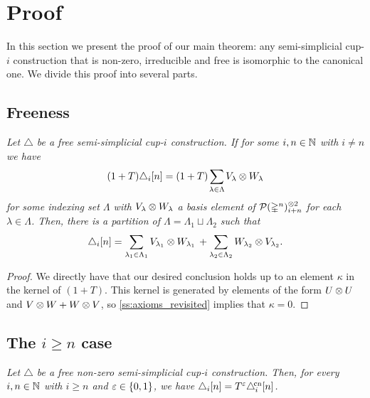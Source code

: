 
\section{Proof}\label{s:proof}

In this section we present the proof of our main theorem: any semi-simplicial \mbox{cup-$i$} construction that is non-zero, irreducible and free is isomorphic to the canonical one.
We divide this proof into several parts.

\subsection{Freeness}\label{ss:freeness_revisited}

\textit{
	Let $\triangle$ be a free semi-simplicial \mbox{cup-$i$} construction.
	If for some $i, n \in \mathbb{N}$ with $i \neq n$ we have
	\[
	(1+T) \triangle_i [n] =
	(1+T) \sum_{\mathclap{\lambda \in \Lambda}} V_\lambda \ot W_\lambda
	\]
	for some indexing set $\Lambda$ with $V_\lambda \otimes W_\lambda$ a basis element of $\mathcal{P}(\mathbb{\Delta}^n)^{\otimes 2}_{i+n}$ for each $\lambda \in \Lambda$. Then, there is a partition of $\Lambda = \Lambda_1 \sqcup \Lambda_2$ such that
	\[
	\triangle_i [n] =
	\sum_{\lambda_1 \in \Lambda_1} V_{\lambda_1} \otimes W_{\lambda_1} \, +
	\sum_{\lambda_2 \in \Lambda_2} W_{\lambda_2} \otimes V_{\lambda_2}.
	\]
}

\begin{proof}
	We directly have that our desired conclusion holds up to an element $\kappa$ in the kernel of $(1+T)$.
	This kernel is generated by elements of the form $U \otimes U$ and $V \otimes W + W \otimes V$, so \cref{ss:axioms_revisited} implies that $\kappa = 0$.
\end{proof}

\subsection{The $i \geq n$ case}\label{ss:i_geq_n}

\textit{
	Let $\triangle$ be a free non-zero semi-simplicial \mbox{cup-$i$} construction.
	Then, for every $i, n \in \mathbb{N}$ with $i \geq n$ and $\varepsilon \in \{0,1\}$, we have $\triangle_i[n] = T^\varepsilon\triangle^{\!\mathrm{cn}}_i[n]$.
}

